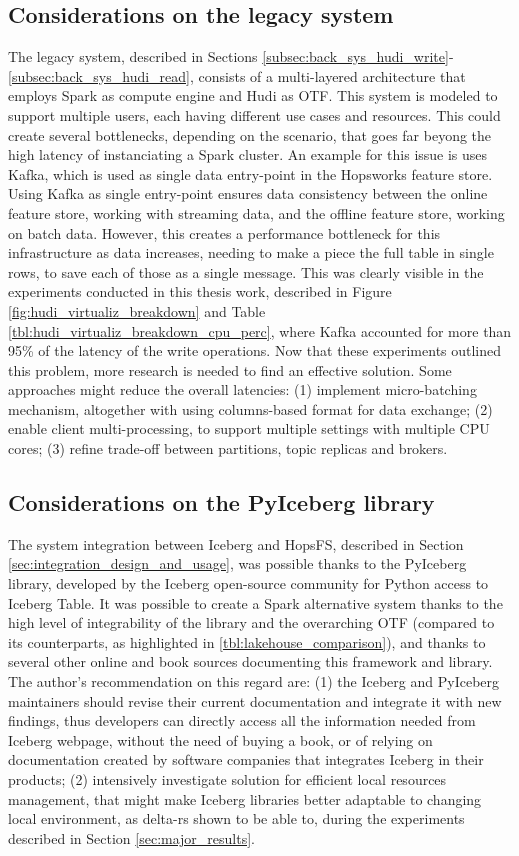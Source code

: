\subsection{Considerations on the legacy system}
The legacy system, described in Sections \ref{subsec:back_sys_hudi_write}-\ref{subsec:back_sys_hudi_read}, consists of a multi-layered architecture that employs Spark as compute engine and Hudi as \gls{OTF}. This system is modeled to support multiple users, each having different use cases and resources. This could create several bottlenecks, depending on the scenario, that goes far beyong the high latency of instanciating a Spark cluster. An example for this issue is uses Kafka, which is used as single data entry-point in the Hopsworks feature store. Using Kafka as single entry-point ensures data consistency between the online feature store, working with streaming data, and the offline feature store, working on batch data. However, this creates a performance bottleneck for this infrastructure as data increases, needing to make a piece the full table in single rows, to save each of those as a single message. This was clearly visible in the experiments conducted in this thesis work, described in Figure \ref{fig:hudi_virtualiz_breakdown} and Table \ref{tbl:hudi_virtualiz_breakdown_cpu_perc}, where Kafka accounted for more than 95\% of the latency of the write operations. Now that these experiments outlined this problem, more research is needed to find an effective solution. Some approaches might reduce the overall latencies: (1) implement micro-batching mechanism, altogether with using columns-based format for data exchange; (2) enable client multi-processing, to support multiple settings with multiple \gls{CPU} cores; (3) refine trade-off between partitions, topic replicas and brokers.



\subsection{Considerations on the PyIceberg library}
The system integration between Iceberg and \gls{HopsFS}, described in Section \ref{sec:integration_design_and_usage}, was possible thanks to the PyIceberg library, developed by the Iceberg open-source community for Python access to Iceberg Table. It was possible to create a Spark alternative system thanks to the high level of integrability of the library and the overarching \gls{OTF} (compared to its counterparts, as highlighted in \ref{tbl:lakehouse_comparison}), and thanks to several other online and book sources documenting this framework and library. The author's recommendation on this regard are: (1) the Iceberg and PyIceberg maintainers should revise their current documentation and integrate it with new findings, thus developers can directly access all the information needed from Iceberg webpage, without the need of buying a book, or of relying on documentation created by software companies that integrates Iceberg in their products; (2) intensively investigate solution for efficient local resources management, that might make Iceberg libraries better adaptable to changing local environment, as delta-rs shown to be able to, during the experiments described in Section \ref{sec:major_results}.